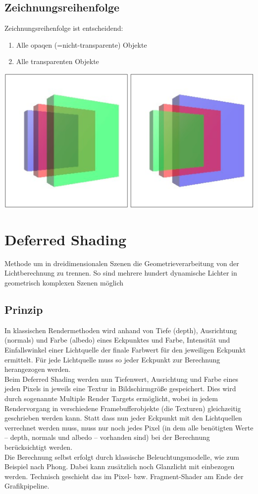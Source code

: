 \documentclass[10pt]{article}
\begin{document}
\subsection{Zeichnungsreihenfolge}
Zeichnungsreihenfolge ist entscheidend:
\begin{enumerate}
	\item Alle opaqen (=nicht-transparente) Objekte
	\item Alle transparenten Objekte
\end{enumerate}
\begin{center}
	\includegraphics[scale=0.2]{alphablending_order.png}
\end{center}

\newpage
\section{Deferred Shading}
Methode um in dreidimensionalen Szenen die Geometrieverarbeitung von der Lichtberechnung zu trennen. So sind mehrere hundert dynamische Lichter in geometrisch komplexen Szenen möglich
\subsection{Prinzip}
In klassischen Rendermethoden wird anhand von Tiefe (depth), Ausrichtung (normals) und Farbe (albedo) eines Eckpunktes und Farbe, Intensität und Einfallswinkel einer Lichtquelle der finale Farbwert für den jeweiligen Eckpunkt ermittelt. Für jede Lichtquelle muss so jeder Eckpunkt zur Berechnung herangezogen werden. \\
Beim Deferred Shading werden nun Tiefenwert, Ausrichtung und Farbe eines jeden Pixels in jeweils eine Textur in Bildschirmgröße gespeichert. Dies wird durch sogenannte Multiple Render Targets ermöglicht, wobei in jedem Rendervorgang in verschiedene Framebufferobjekte (die Texturen) gleichzeitig geschrieben werden kann. Statt dass nun jeder Eckpunkt mit den Lichtquellen verrechnet werden muss, muss nur noch jedes Pixel (in dem alle benötigten Werte – depth, normals und albedo – vorhanden sind) bei der Berechnung berücksichtigt werden. \\
Die Berechnung selbst erfolgt durch klassische Beleuchtungsmodelle, wie zum Beispiel nach Phong. Dabei kann zusätzlich noch Glanzlicht mit einbezogen werden. Technisch geschieht das im Pixel- bzw. Fragment-Shader am Ende der Grafikpipeline.
\end{document}
